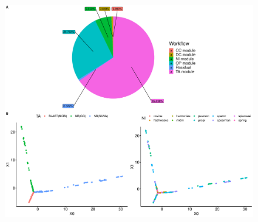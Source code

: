 \documentclass[letterpaper,12pt]{article}
\providecommand{\DIFaddbeginFL}{} %
\providecommand{\DIFaddendFL}{} %
\providecommand{\DIFdelbeginFL}{} %
\providecommand{\DIFdelendFL}{} %
\newcommand{\DIFscaledelfig}{0.5}
\newlength{\DIFdelgraphicswidth} %
\newlength{\DIFdelgraphicsheight} %
\newcommand{\DIFaddincludegraphics}[2][]{{\color{blue}\fbox{\DIFOincludegraphics[#1]{#2}}}} %
\newcommand{\DIFdelincludegraphics}[2][]{%
\sbox{\DIFdelgraphicsbox}{\DIFOincludegraphics[#1]{#2}}%
\settoboxwidth{\DIFdelgraphicswidth}{\DIFdelgraphicsbox} %
\settoboxtotalheight{\DIFdelgraphicsheight}{\DIFdelgraphicsbox} %
\scalebox{\DIFscaledelfig}{%
\parbox[b]{\DIFdelgraphicswidth}{\usebox{\DIFdelgraphicsbox}\\[-\baselineskip] \rule{\DIFdelgraphicswidth}{0em}}\llap{\resizebox{\DIFdelgraphicswidth}{\DIFdelgraphicsheight}{%
\setlength{\unitlength}{\DIFdelgraphicswidth}%
\begin{picture}(1,1)%
\thicklines\linethickness{2pt} %
{\color[rgb]{1,0,0}\put(0,0){\framebox(1,1){}}}%
{\color[rgb]{1,0,0}\put(0,0){\line( 1,1){1}}}%
{\color[rgb]{1,0,0}\put(0,1){\line(1,-1){1}}}%
\end{picture}%
}\hspace*{3pt}}} %
} %
\DeclareRobustCommand{\DIFaddbeginFL}{\DIFOaddbeginFL \let\includegraphics\DIFaddincludegraphics} %
\DeclareRobustCommand{\DIFaddendFL}{\DIFOaddendFL \let\includegraphics\DIFOincludegraphics} %
\DeclareRobustCommand{\DIFdelbeginFL}{\DIFOdelbeginFL \let\includegraphics\DIFdelincludegraphics} %
\DeclareRobustCommand{\DIFdelendFL}{\DIFOaddendFL \let\includegraphics\DIFOincludegraphics} %
\begin{document}
  \begin{figure}[H]
    \centering
    \DIFdelbeginFL %
\DIFdelendFL \DIFaddbeginFL \includegraphics[width=\textwidth]{figure2.pdf}
  \DIFaddendFL \end{figure}
\end{document}
